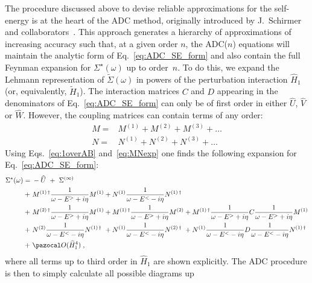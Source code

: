  The  procedure discussed above to devise reliable approximations for the self-energy is at the heart of the
 ADC method, originally introduced by J.~Schirmer and collaborators~\cite{ch11_Schirmer1982ADC2,ch11_Schirmer1983ADCn}.
 This approach  generates  a hierarchy of approximations of increasing accuracy such that,
 at a given order $n$, the ADC($n$) equations will maintain the analytic form of Eq.~\eqref{eq:ADC_SE_form} and
 also contain the full Feynman expansion for $\Sigma^\star(\omega)$ up to order~$n$.
To do this, we expand the Lehmann representation of $\widetilde\Sigma(\omega)$ in powers of the perturbation interaction $\widehat{H}_1$ (or, equivalently, $\widetilde{H}_1$). The interaction matrices 
$C$ and $D$ appearing in the denominators of Eq.~\eqref{eq:ADC_SE_form} can only be of first order in either $\widehat{U}$,  $\widehat{V}$ or $\widehat{W}$. However, the coupling matrices can contain terms of any order:
\begin{align}
  M =& M^{(1)} +  M^{(2)} +  M^{(3)} +  \ldots
   \nonumber  \\
  N =&  N^{(1)} +  N^{(2)} +  N^{(3)} + \ldots  
 \label{eq:MNexp}
\end{align}
Using  Eqs.~\eqref{eq:1overAB}  and~\eqref{eq:MNexp} one finds the following expansion
for Eq.~\eqref{eq:ADC_SE_form}:
\begin{align}
  \Sigma^{\star}(\omega) ={}&  - \widehat{U}  ~+~   \Sigma^{(\infty)} 
  \nonumber \\
   +~& M^{(1) \, \dagger}\frac1{\omega - E^>  + i \eta}M^{(1)} +N^{(1)}\frac1{\omega - E^<  - i \eta}N^{(1) \, \dagger}
    \nonumber \\
  +~& M^{(2) \, \dagger}\frac1{\omega - E^> + i \eta}M^{(1)}  +   M^{(1) \, \dagger}\frac1{\omega - E^> + i \eta}M^{(2)}
 +{}  M^{(1) \, \dagger}\frac1{\omega - E^> + i \eta} C \frac1{\omega - E^> + i \eta}M^{(1)}  
    \nonumber \\
  +~& N^{(2)}\frac1{\omega - E^< - i \eta}N^{(1) \, \dagger} ~ +   N^{(1)}\frac1{\omega - E^< - i \eta}N^{(2) \, \dagger}
 ~+{}  N^{(1)}\frac1{\omega - E^< - i \eta} D \frac1{\omega - E^< - i \eta}N^{(1) \, \dagger}  
 \nonumber \\
 +~&   {\pazocal O}({ \widehat{H}_1}^4)  \; ,
 \label{eq:ADC_SE_form_exp}
\end{align}
where all terms up to third order in $\widehat H_1$ are shown explicitly.
The ADC procedure is then to simply calculate all possible diagrams up
